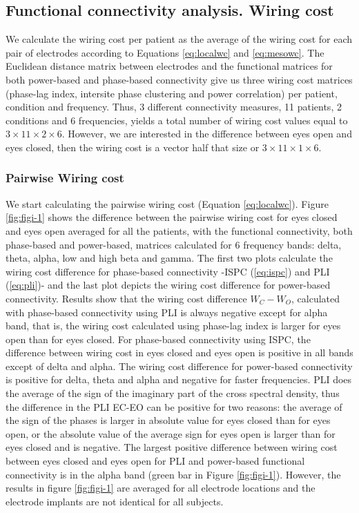\documentclass[11pt, onecolumn]{article}
\begin{document}
\subsection{Functional connectivity analysis. Wiring cost}
We calculate the wiring cost per patient as the average of the wiring cost for each pair of electrodes according to Equations \ref{eq:localwc} and  \ref{eq:mesowc}. The Euclidean distance matrix between electrodes and the functional matrices for both power-based and phase-based connectivity give us three wiring cost matrices (phase-lag index, intersite phase clustering and power correlation) per patient, condition and frequency. Thus, 3 different connectivity measures, 11 patients, 2 conditions and 6 frequencies, yields a total number of wiring cost values equal to $3\times 11 \times 2 \times 6$. However, we are interested in the difference between eyes open and eyes closed, then the wiring cost is a vector half that size or $3\times 11 \times 1 \times 6$.

\subsubsection{Pairwise Wiring cost}
We start calculating the pairwise wiring cost (Equation \ref{eq:localwc}). Figure \ref{fig:figi-1} shows the difference between the pairwise wiring cost for eyes closed and eyes open averaged for all the patients, with the functional connectivity, both phase-based and power-based, matrices calculated for 6 frequency bands: delta, theta, alpha, low and high beta and gamma. 
The first two plots calculate the wiring cost difference for phase-based connectivity -ISPC (\ref{eq:ispc}) and PLI (\ref{eq:pli})- and the last plot depicts the wiring cost difference for power-based connectivity. 
Results show that the wiring cost difference $W_C - W_O$, calculated with phase-based connectivity using PLI is always negative except for alpha band, that is, the wiring cost calculated using phase-lag index is larger for eyes open than for eyes closed. For phase-based connectivity using ISPC, the difference between wiring cost in eyes closed and eyes open is positive in all bands except of delta and alpha. The wiring cost difference for power-based connectivity is positive for delta, theta and alpha and negative for faster frequencies. PLI does the average of the sign of the imaginary part of the cross spectral density, thus the difference in the PLI EC-EO can be positive for two reasons: the average of the sign of the phases is larger in absolute value for eyes closed than for eyes open, or the absolute value of the average sign for eyes open is larger than for eyes closed and is negative.
The largest positive difference between wiring cost between eyes closed and eyes open for PLI and power-based functional connectivity is in the alpha band (green bar in Figure \ref{fig:figi-1}).
However, the results in figure \ref{fig:figi-1} are averaged for all electrode locations and the electrode implants are not identical for all subjects. 
\end{document}
